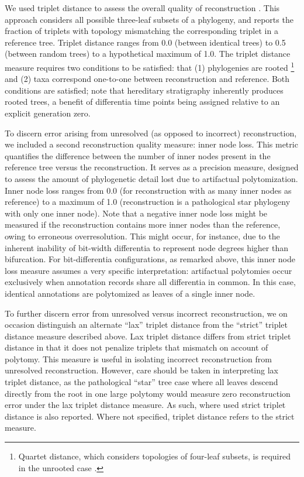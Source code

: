 We used triplet distance to assess the overall quality of reconstruction \citep{critchlow1996triples}.
This approach considers all possible three-leaf subsets of a phylogeny, and reports the fraction of triplets with topology mismatching the corresponding triplet in a reference tree.
Triplet distance ranges from 0.0 (between identical trees) to 0.5 (between random trees) to a hypothetical maximum of 1.0.
The triplet distance measure requires two conditions to be satisfied: that (1) phylogenies are rooted%
\footnote{Quartet distance, which considers topologies of four-leaf subsets, is required in the unrooted case \citep{estabrook1985comparison}.}
and (2) taxa correspond one-to-one between reconstruction and reference.
Both conditions are satisfied; note that hereditary stratigraphy inherently produces rooted trees, a benefit of differentia time points being assigned relative to an explicit generation zero.

To discern error arising from unresolved (as opposed to incorrect) reconstruction, we included a second reconstruction quality measure: inner node loss.
This metric quantifies the difference between the number of inner nodes present in the reference tree versus the reconstruction.
It serves as a precision measure, designed to assess the amount of phylogenetic detail lost due to artifactual polytomization.
Inner node loss ranges from 0.0 (for reconstruction with as many inner nodes as reference) to a maximum of 1.0 (reconstruction is a pathological star phylogeny with only one inner node).
Note that a negative inner node loss might be measured if the reconstruction contains more inner nodes than the reference, owing to erroneous overresolution.
This might occur, for instance, due to the inherent inability of bit-width differentia to represent node degrees higher than bifurcation.
For bit-differentia configurations, as remarked above, this inner node loss measure assumes a very specific interpretation: artifactual polytomies occur exclusively when annotation records share all differentia in common.
In this case, identical annotations are polytomized as leaves of a single inner node.

To further discern error from unresolved versus incorrect reconstruction, we on occasion distinguish an alternate ``lax'' triplet distance from the ``strict'' triplet distance measure described above.
Lax triplet distance differs from strict triplet distance in that it does not penalize triplets that mismatch on account of polytomy.
This measure is useful in isolating incorrect reconstruction from unresolved reconstruction.
However, care should be taken in interpreting lax triplet distance, as the pathological ``star'' tree case where all leaves descend directly from the root in one large polytomy would measure zero reconstruction error under the lax triplet distance measure.
As such, where used strict triplet distance is also reported.
Where not specified, triplet distance refers to the strict measure.

